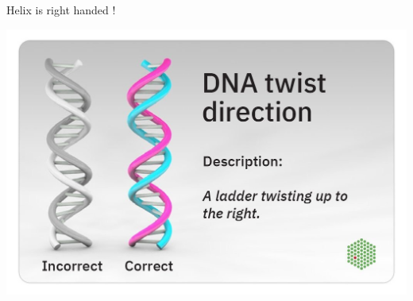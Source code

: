 \documentclass[11pt,ignorenonframetext,aspectratio=169]{beamer}
\begin{document}
\begin{frame}{Helix is right handed !}
\protect\hypertarget{helix-is-right-handed}{}
\begin{center}\includegraphics[width=0.6\linewidth]{../images/right_handed_helix} \end{center}
\end{frame}
\end{document}
